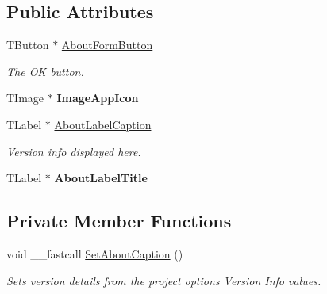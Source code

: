 \subsection*{Public Attributes}
\begin{DoxyCompactItemize}
\item 
\mbox{\label{class_t_about_form_add3f256ba4f1ed42204c0e77c0d71552}} 
T\+Button $\ast$ \mbox{\hyperlink{class_t_about_form_add3f256ba4f1ed42204c0e77c0d71552}{About\+Form\+Button}}
\begin{DoxyCompactList}\small\item\em The OK button. \end{DoxyCompactList}\item 
\mbox{\label{class_t_about_form_a3c3968d0c1473343931bdd0ac25d99ab}} 
T\+Image $\ast$ {\bfseries Image\+App\+Icon}
\item 
\mbox{\label{class_t_about_form_aa188b96e0810fb8944b8e7fd7a2deea4}} 
T\+Label $\ast$ \mbox{\hyperlink{class_t_about_form_aa188b96e0810fb8944b8e7fd7a2deea4}{About\+Label\+Caption}}
\begin{DoxyCompactList}\small\item\em Version info displayed here. \end{DoxyCompactList}\item 
\mbox{\label{class_t_about_form_a0d1afa81071159368263c6a1d1ed0c7d}} 
T\+Label $\ast$ {\bfseries About\+Label\+Title}
\end{DoxyCompactItemize}
\subsection*{Private Member Functions}
\begin{DoxyCompactItemize}
\item 
\mbox{\label{class_t_about_form_aae86823c5d44708f264e2c1f8cd52af1}} 
void \+\_\+\+\_\+fastcall \mbox{\hyperlink{class_t_about_form_aae86823c5d44708f264e2c1f8cd52af1}{Set\+About\+Caption}} ()
\begin{DoxyCompactList}\small\item\em Sets version details from the project options \textquotesingle{}Version Info\textquotesingle{} values. \end{DoxyCompactList}\end{DoxyCompactItemize}


